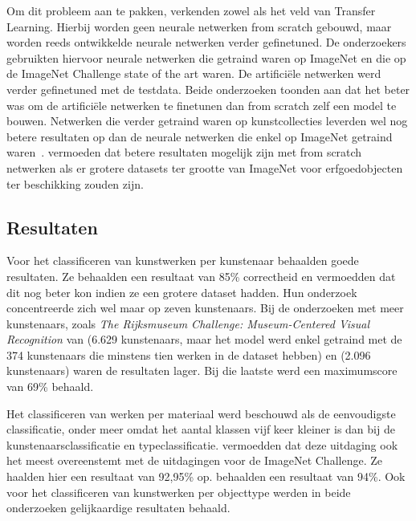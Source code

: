 Om dit probleem aan te pakken, verkenden zowel \textcite{Sabatteli2018?} als \textcite{Elgammal2018} het veld van Transfer Learning. Hierbij worden geen neurale netwerken from scratch gebouwd, maar worden reeds ontwikkelde neurale netwerken verder gefinetuned. De onderzoekers gebruikten hiervoor neurale netwerken die getraind waren op ImageNet en die op de ImageNet Challenge state of the art waren. De artifici\"{e}le netwerken werd verder gefinetuned met de testdata. Beide onderzoeken toonden aan dat het beter was om de artificiële netwerken te finetunen dan from scratch zelf een model te bouwen. Netwerken die verder getraind waren op kunstcollecties leverden wel nog betere resultaten op dan de neurale netwerken die enkel op ImageNet getraind waren~\autocite{Sabatteli2018?}. \textcite{Elgammal2018} vermoeden dat betere resultaten mogelijk zijn met from scratch netwerken als er grotere datasets ter grootte van ImageNet voor erfgoedobjecten ter beschikking zouden zijn.

\subsection{Resultaten}
\label{subsec:cv-voor-ce-resultaten}

Voor het classificeren van kunstwerken per kunstenaar behaalden \textcite{Blessings2013} goede resultaten. Ze behaalden een resultaat van 85\% correctheid en vermoedden dat dit nog beter kon indien ze een grotere dataset hadden. Hun onderzoek concentreerde zich wel maar op zeven kunstenaars. Bij de onderzoeken met meer kunstenaars, zoals \textit{The Rijksmuseum Challenge: Museum-Centered Visual Recognition} van \textcite{Mensink2014} (6.629 kunstenaars, maar het model werd enkel getraind met de 374 kunstenaars die minstens tien werken in de dataset hebben) en \textcite{Sabatteli2018?} (2.096 kunstenaars) waren de resultaten lager. Bij die laatste werd een maximumscore van 69\% behaald.

Het classificeren van werken per materiaal werd beschouwd als de eenvoudigste classificatie, onder meer omdat het aantal klassen vijf keer kleiner is dan bij de kunstenaarsclassificatie en typeclassificatie. \textcite{Sabatteli2018?} vermoedden dat deze uitdaging ook het meest overeenstemt met de uitdagingen voor de ImageNet Challenge. Ze haalden hier een resultaat van 92,95\% op. \textcite{Mensink2014} behaalden een resultaat van 94\%. Ook voor het classificeren van kunstwerken per objecttype werden in beide onderzoeken gelijkaardige resultaten behaald.

